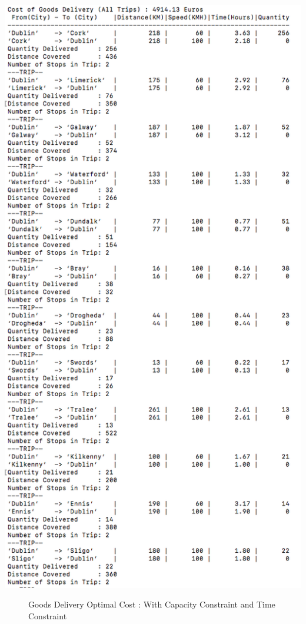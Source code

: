 \documentclass[a4paper&11pt]{article}
\begin{document}
\begin{center}
\includegraphics[scale=0.8]{20fig4.png}
\begin{figure}[H]
\caption{Goods Delivery Optimal Cost :  With Capacity Constraint  and Time Constraint}
\end{figure}
\end{center}
\end{document}
